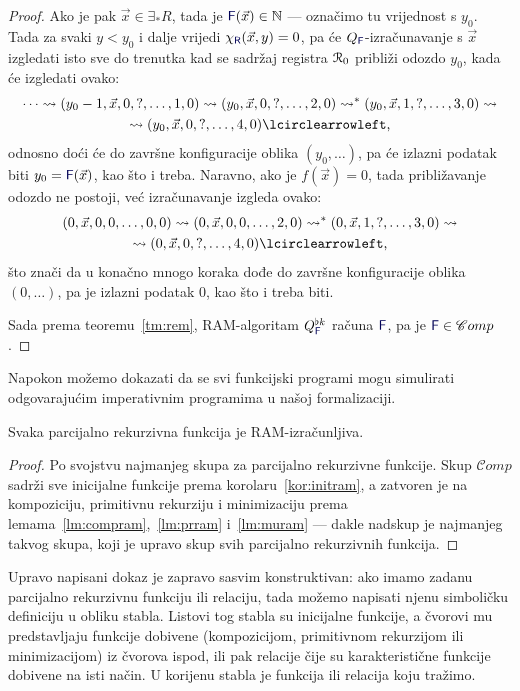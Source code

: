 \begin{proof}
Ako je pak $\vec x\in\exists_*R$, tada je $\f F(\vec x)\in\N$ --- označimo tu vrijednost s $y_0$. Tada za svaki $y<y_0$ i dalje vrijedi $\chi_{\f R}(\vec x,y)=0$, pa će $Q_{\f F}$-izračunavanje s $\vec x$ izgledati isto sve do trenutka kad se sadržaj registra $\mathcal R_{0}$ približi odozdo $y_0$, kada će izgledati ovako:
\begin{multline}
    \dotsb\leadsto(y_0-1,\vec x,0,?,\dotsc,1,0)\leadsto
    (y_0,\vec x,0,?,\dotsc,2,0)\leadsto^*
    (y_0,\vec x,1,?,\dotsc,3,0)\leadsto\\
    \leadsto(y_0,\vec x,0,?,\dotsc,4,0)\lcirclearrowleft\text,
\end{multline}
odnosno doći će do završne konfiguracije oblika $(y_0,\dotsc)$, pa će izlazni podatak biti $y_0=\f F(\vec x)$, kao što i treba. Naravno, ako je $f(\vec x)=0$, tada približavanje odozdo ne postoji, već izračunavanje izgleda ovako:
\begin{multline}
    (0,\vec x,0,0,\dotsc,0,0)\leadsto
    (0,\vec x,0,0,\dotsc,2,0)\leadsto^*
    (0,\vec x,1,?,\dotsc,3,0)\leadsto\\
    \leadsto(0,\vec x,0,?,\dotsc,4,0)\lcirclearrowleft\text,
\end{multline}
što znači da u konačno mnogo koraka dođe do završne konfiguracije oblika $(0,\dotsc)$, pa je izlazni podatak $0$, kao što i treba biti.

    Sada prema teoremu~\ref{tm:rem}, RAM-algoritam $Q_{\f F}^{\flat k}$ računa $\f F$, pa je $\f F\in\mathscr Comp$.
\end{proof}

Napokon možemo dokazati da se svi funkcijski programi mogu simulirati odgovarajućim imperativnim programima u našoj formalizaciji.

\begin{teorem}[{name=[RAM-izračunljivost parcijalno rekurzivnih funkcija]}]\label{tm:pir}
Svaka parcijalno rekurzivna funkcija je RAM-izračunljiva.
\end{teorem}
\begin{proof}
Po svojstvu najmanjeg skupa za parcijalno rekurzivne funkcije. Skup $\mathscr Comp$ sadrži sve inicijalne funkcije prema korolaru~\ref{kor:initram}, a zatvoren je na kompoziciju, primitivnu rekurziju i minimizaciju prema lemama~\ref{lm:compram},~\ref{lm:prram} i~\ref{lm:muram} --- dakle nadskup je najmanjeg takvog skupa, koji je upravo skup svih parcijalno rekurzivnih funkcija.
\end{proof}

Upravo napisani dokaz je zapravo sasvim konstruktivan: ako imamo zadanu parcijalno rekurzivnu funkciju ili relaciju, tada možemo napisati njenu simboličku definiciju u obliku stabla. Listovi tog stabla su inicijalne funkcije, a čvorovi mu predstavljaju funkcije dobivene (kompozicijom, primitivnom rekurzijom ili minimizacijom) iz čvorova ispod, ili pak relacije čije su karakteristične funkcije dobivene na isti način. U korijenu stabla je funkcija ili relacija koju tražimo.

